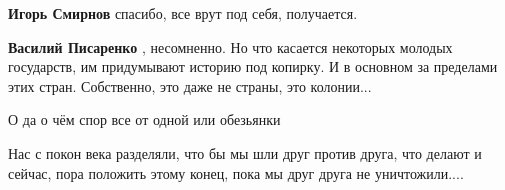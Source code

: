 \begin{itemize}
\begin{itemize}
\textbf{Игорь Смирнов} спасибо, все врут под себя, получается.

\textbf{Василий Писаренко} , несомненно.
Но что касается некоторых молодых государств, им придумывают историю под копирку. И в основном за пределами этих стран. Собственно, это даже не страны, это колонии...

\end{itemize} %

О да о чём спор все от одной или обезьянки


Нас с покон века разделяли, что бы мы шли друг против друга, что делают и
сейчас, пора положить этому конец, пока мы друг друга не уничтожили....

\end{itemize} %
